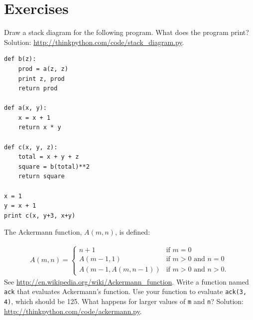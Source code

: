 \documentclass[10pt]{book}
\begin{document}
\section{Exercises}

\begin{exercise}

Draw a stack diagram for the following program.  What does the program print?
Solution: \url{http://thinkpython.com/code/stack_diagram.py}.

\begin{verbatim}
def b(z):
    prod = a(z, z)
    print z, prod
    return prod

def a(x, y):
    x = x + 1
    return x * y

def c(x, y, z):
    total = x + y + z
    square = b(total)**2
    return square

x = 1
y = x + 1
print c(x, y+3, x+y)
\end{verbatim}

\end{exercise}


\begin{exercise}
\label{ackermann}

The Ackermann function, $A(m, n)$, is defined:

\begin{eqnarray*}
A(m, n) = \begin{cases} 
              n+1 & \mbox{if } m = 0 \\ 
        A(m-1, 1) & \mbox{if } m > 0 \mbox{ and } n = 0 \\ 
A(m-1, A(m, n-1)) & \mbox{if } m > 0 \mbox{ and } n > 0.
\end{cases} 
\end{eqnarray*}
%
See \url{http://en.wikipedia.org/wiki/Ackermann_function}.
Write a function named {\tt ack} that evaluates Ackermann's function.
Use your function to evaluate {\tt ack(3, 4)}, which should be 125.
What happens for larger values of {\tt m} and {\tt n}?
Solution: \url{http://thinkpython.com/code/ackermann.py}.

\end{exercise}
\end{document}
